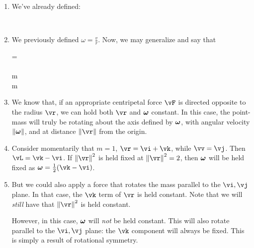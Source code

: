 \begin{enumerate}
  \item We've already defined:

  \begin{nedqn}
    \vtau
  \eqcol
    \vr \cross \vF
  \\
    \vL
  \eqcol
    \vr \cross \vp
    \vtau
  \eqcol
     \vL
  \end{nedqn}

  \item We previously defined $\omega = \frac{v}{r}$. Now, we may
  generalize and say that

  \begin{nedqn}
    \vomega
  \eqcol
    \frac{\vr \cross \vv}{\norm{\vr}}
    \vomega \cross \vr
  \eqcol
    \frac{\vr \cross \vv}{\norm{\vr}} \cross \vr
  =
    \vv
    \vL
  \eqcol
    \vr \cross \vp
  \\
  \eqcol
    \vr \cross {}
  \\
  \eqcol
    m \vr \cross \parens{\vomega \cross \vr}
  \\
  \eqcol
    m \normsq{\vr} \vomega
  \end{nedqn}

  \item We know that, if an appropriate centripetal force $\vF$ is
  directed opposite to the radius $\vr$, we can hold both $\vr$ and
  $\bm{\mathrm{\omega}}$ constant. In this case, the point-mass will truly be
  rotating about the axis defined by $\bm{\mathrm{\omega}}$, with angular velocity
  $\left\Vert \bm{\mathrm{\omega}} \right\Vert$, and at distance $\norm{\vr}$ from the origin.

  \item Consider momentarily that $m = 1$, $\vr = \vi + \vk$, while $\vv
  = \vj$. Then $\vL = \vk - \vi$. If $\normsq{\vr}$ is held fixed at
  $\normsq{\vr} = 2$, then $\bm{\mathrm{\omega}}$ will be held fixed as $\vomega =
  \half \parens{\vk - \vi}$.

  \item But we could also apply a force that rotates the mass parallel
  to the $\vi, \vj$ plane. In that case, the $\vk$ term of $\vr$ is held
  constant. Note that we will \emph{still} have that $\normsq{\vr}$ is
  held constant.

  However, in this case, $\bm{\mathrm{\omega}}$ will \emph{not} be held constant.
  This will also rotate parallel to the $\vi, \vj$ plane: the $\vk$
  component will always be fixed. This is simply a result of rotational
  symmetry.


\end{enumerate}
